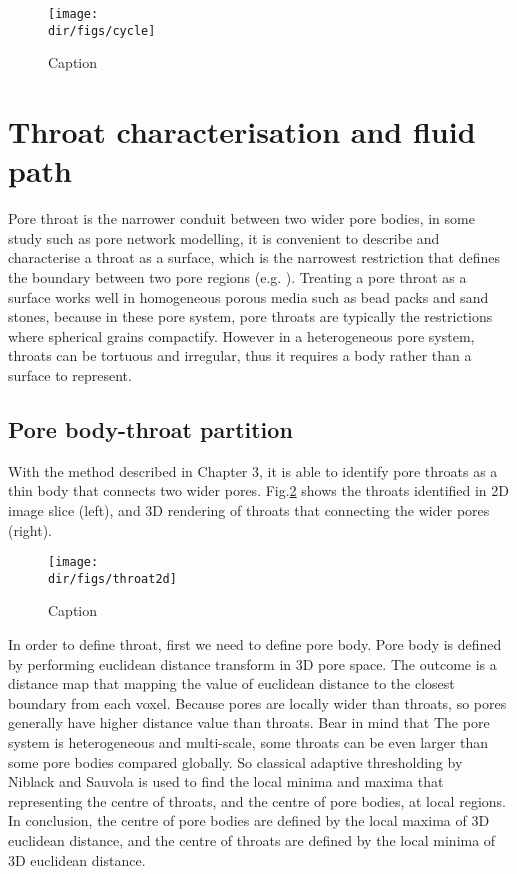\begin{figure}
    \centering
    \texttt{[image: \\dir/figs/cycle]}
    \caption{Caption}
    \label{cycle}
\end{figure}

\section{Throat characterisation and fluid path}
Pore throat is the narrower conduit between two wider pore bodies, in some study such as pore network modelling, it is convenient to describe and characterise a throat as a surface, which is the narrowest restriction that defines the boundary between two pore regions (e.g. \citet{singh2016imaging,wildenschild2013x}). Treating a pore throat as a surface works well in homogeneous porous media such as bead packs and sand stones, because in these pore system, pore throats are typically the restrictions where spherical grains compactify. However in a heterogeneous pore system, throats can be tortuous and irregular, thus it requires a body rather than a surface to represent.

\subsection{Pore body-throat partition}
With the method described in Chapter 3, it is able to identify pore throats as a thin body that connects two wider pores. Fig.\ref{throat2d} shows the throats identified in 2D image slice (left), and 3D rendering of throats that connecting the wider pores (right). 

\begin{figure}
    \centering
    \texttt{[image: \\dir/figs/throat2d]}
    \caption{Caption}
    \label{throat2d}
\end{figure}

In order to define throat, first we need to define pore body. Pore body is defined by performing euclidean distance transform in 3D pore space. The outcome is a distance map that mapping the value of euclidean distance to the closest boundary from each voxel. Because pores are locally wider than throats, so pores generally have higher distance value than throats. Bear in mind that The pore system is heterogeneous and multi-scale, some throats can be even larger than some pore bodies compared globally. So classical adaptive thresholding by Niblack and Sauvola \citep{niblack1985introduction, sauvola2000adaptive} is used to find the local minima and maxima that representing the centre of throats, and the centre of pore bodies, at local regions. In conclusion, the centre of pore bodies are defined by the local maxima of 3D euclidean distance, and the centre of throats are defined by the local minima of 3D euclidean distance.

